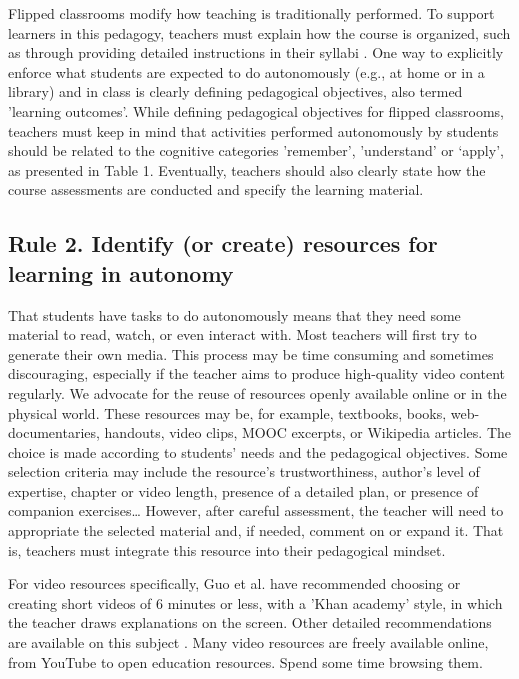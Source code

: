 \documentclass[10pt,letterpaper]{article}
\begin{document}
Flipped classrooms modify how teaching is traditionally performed. To support learners in this pedagogy, 
teachers must explain how the course is organized, such as through providing detailed instructions in
their syllabi \cite{grunert_obrien_course_2008}. One way to explicitly enforce what students 
are expected to do autonomously (e.g., at home or in a library) and in class is clearly defining pedagogical objectives, also termed 'learning outcomes'. 
While defining pedagogical objectives for flipped classrooms, teachers must keep in mind 
that activities performed autonomously by students should be related to the cognitive categories 'remember', 'understand' 
or `apply', as presented in Table 1. Eventually, teachers should also clearly state how the course assessments 
are conducted and specify the learning material.


\subsection{Rule 2. Identify (or create) resources for learning in autonomy}

That students have tasks to do autonomously means that they need some material to read, watch, or even interact with. 
Most teachers will first try to generate their own media. This process may be time consuming and sometimes discouraging, 
especially if the teacher aims to produce high-quality video content regularly. We advocate for the reuse of resources 
openly available online or in the physical world. These resources may be, for example, textbooks, books, web-documentaries, handouts, video clips, 
MOOC excerpts, or Wikipedia articles. The choice is made according to students' needs and the pedagogical objectives. 
Some selection criteria may include the resource’s trustworthiness, author's level of expertise, chapter or video length, 
presence of a detailed plan, or presence of companion exercises\ldots{} However, after careful assessment, the teacher will 
need to appropriate the selected material and, if needed, comment on or expand it. That is, teachers must integrate this resource into their pedagogical mindset.

For video resources specifically, Guo et al. \cite{guo_how_2014} have recommended choosing or creating short videos of 6 minutes or less, 
with a 'Khan academy' style, in which the teacher draws explanations on the screen. Other detailed recommendations are available 
on this subject \cite{mayer_cambridge_2005}. Many video resources are freely available online, from YouTube to open education
resources. Spend some time browsing them.
\end{document}
